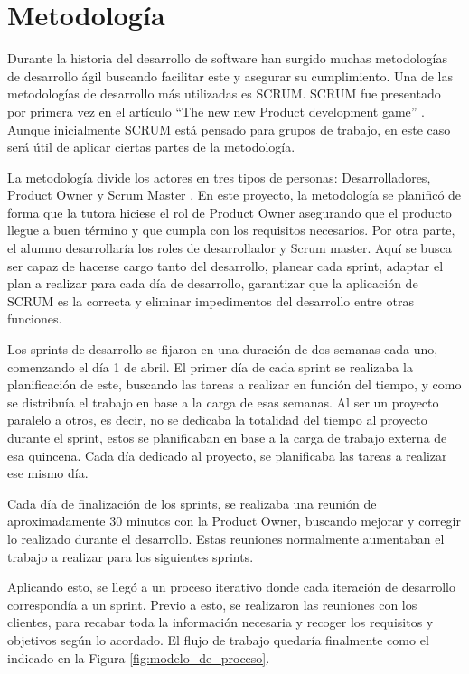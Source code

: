 \section{Metodología}

Durante la historia del desarrollo de software han surgido muchas metodologías de desarrollo ágil buscando facilitar este y asegurar su cumplimiento. Una de las metodologías de desarrollo más utilizadas es SCRUM. SCRUM fue presentado por primera vez en el artículo ``The new new Product development game'' \cite{takeuchi1986new}. Aunque inicialmente SCRUM está pensado para grupos de trabajo, en este caso será útil de aplicar ciertas partes de la metodología.

La metodología divide los actores en tres tipos de personas: Desarrolladores, Product Owner y Scrum Master \cite{schwaber2011scrum}. En este proyecto, la metodología se planificó de forma que la tutora hiciese el rol de Product Owner asegurando que el producto llegue a buen término y que cumpla con los requisitos necesarios. Por otra parte, el alumno desarrollaría los roles de desarrollador y Scrum master. Aquí se busca ser capaz de hacerse cargo tanto del desarrollo, planear cada sprint, adaptar el plan a realizar para cada día de desarrollo, garantizar que la aplicación de SCRUM es la correcta y eliminar impedimentos del desarrollo entre otras funciones. 

Los sprints de desarrollo se fijaron en una duración de dos semanas cada uno, comenzando el día 1 de abril. El primer día de cada sprint se realizaba la planificación de este, buscando las tareas a realizar en función del tiempo, y como se distribuía el trabajo en base a la carga de esas semanas. Al ser un proyecto paralelo a otros, es decir, no se dedicaba la totalidad del tiempo al proyecto durante el sprint, estos se planificaban en base a la carga de trabajo externa de esa quincena. Cada día dedicado al proyecto, se planificaba las tareas a realizar ese mismo día. 

Cada día de finalización de los sprints, se realizaba una reunión de aproximadamente 30 minutos con la Product Owner, buscando mejorar y corregir lo realizado durante el desarrollo. Estas reuniones normalmente aumentaban el trabajo a realizar para los siguientes sprints.

Aplicando esto, se llegó a un proceso iterativo donde cada iteración de desarrollo correspondía a un sprint. Previo a esto, se realizaron las reuniones con los clientes, para recabar toda la información necesaria y recoger los requisitos y objetivos según lo acordado. El flujo de trabajo quedaría finalmente como el indicado en la Figura \ref{fig:modelo_de_proceso}.

